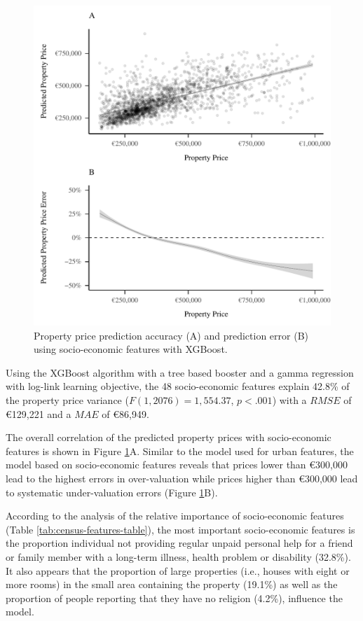 \documentclass[conference,final,]{IEEEtran}
\begin{document}
\begin{figure}[!h]
\includegraphics[width=0.98\columnwidth]{manuscript_files/figure-latex/census-features-xgb-1} \caption{Property price prediction accuracy (A) and prediction error (B) using socio-economic features with XGBoost.}\label{fig:census-features-xgb}
\end{figure}

Using the XGBoost algorithm with a tree based booster and a gamma regression with log-link learning objective, the 48 socio-economic features explain 42.8\% of the property price variance (\(F(1, 2076) = 1,554.37\), \(p < .001\)) with a \(RMSE\) of €129,221 and a \(MAE\) of €86,949.

The overall correlation of the predicted property prices with socio-economic features is shown in Figure \ref{fig:census-features-xgb}A. Similar to the model used for urban features, the model based on socio-economic features reveals that prices lower than €300,000 lead to the highest errors in over-valuation while prices higher than €300,000 lead to systematic under-valuation errors (Figure \ref{fig:census-features-xgb}B).

According to the analysis of the relative importance of socio-economic features (Table \ref{tab:census-features-table}), the most important socio-economic features is the proportion individual not providing regular unpaid personal help for a friend or family member with a long-term illness, health problem or disability (32.8\%). It also appears that the proportion of large properties (i.e., houses with eight or more rooms) in the small area containing the property (19.1\%) as well as the proportion of people reporting that they have no religion (4.2\%), influence the model.
\end{document}
